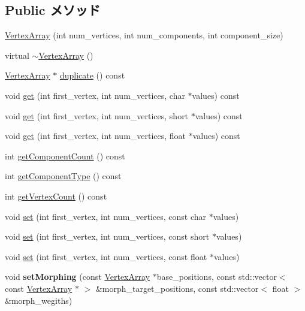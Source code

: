 \subsection*{Public メソッド}
\begin{CompactItemize}
\item 
\hyperlink{classm3g_1_1VertexArray_5f38e30d23b5dc34b223e749e8afd0d0}{VertexArray} (int num\_\-vertices, int num\_\-components, int component\_\-size)
\item 
virtual \hyperlink{classm3g_1_1VertexArray_267fa63cb2f4216729437dc826415911}{$\sim$VertexArray} ()
\item 
\hyperlink{classm3g_1_1VertexArray}{VertexArray} $\ast$ \hyperlink{classm3g_1_1VertexArray_f0dc6a5510bf837ef48129f344d666a8}{duplicate} () const 
\item 
void \hyperlink{classm3g_1_1VertexArray_9d1b801a7c196a07553a5ef4a5473573}{get} (int first\_\-vertex, int num\_\-vertices, char $\ast$values) const 
\item 
void \hyperlink{classm3g_1_1VertexArray_575822f60d7b5e74ed51e94851123038}{get} (int first\_\-vertex, int num\_\-vertices, short $\ast$values) const 
\item 
void \hyperlink{classm3g_1_1VertexArray_79b1ffd7586fe23fb5e31661e4d296e3}{get} (int first\_\-vertex, int num\_\-vertices, float $\ast$values) const 
\item 
int \hyperlink{classm3g_1_1VertexArray_7016f51d2788e78fdd736efd040f5e5e}{getComponentCount} () const 
\item 
int \hyperlink{classm3g_1_1VertexArray_9b7b78fbff0603779ec6bdd2a323c939}{getComponentType} () const 
\item 
int \hyperlink{classm3g_1_1VertexArray_c1c9b7f5b0dcd9c0310d7e77e10081ba}{getVertexCount} () const 
\item 
void \hyperlink{classm3g_1_1VertexArray_c92a86c7439c8e38c7e5b69e3eca3ee1}{set} (int first\_\-vertex, int num\_\-vertices, const char $\ast$values)
\item 
void \hyperlink{classm3g_1_1VertexArray_f417744f1798d293c85c5e7fb6e1e846}{set} (int first\_\-vertex, int num\_\-vertices, const short $\ast$values)
\item 
void \hyperlink{classm3g_1_1VertexArray_24b9d666468f856b2bf09e450b20fdfb}{set} (int first\_\-vertex, int num\_\-vertices, const float $\ast$values)
\item 
\hypertarget{classm3g_1_1VertexArray_b5b62e478fb0964ca1c168714a66e562}{
void \textbf{setMorphing} (const \hyperlink{classm3g_1_1VertexArray}{VertexArray} $\ast$base\_\-positions, const std::vector$<$ const \hyperlink{classm3g_1_1VertexArray}{VertexArray} $\ast$ $>$ \&morph\_\-target\_\-positions, const std::vector$<$ float $>$ \&morph\_\-wegiths)}
\label{classm3g_1_1VertexArray_b5b62e478fb0964ca1c168714a66e562}


\end{CompactItemize}
